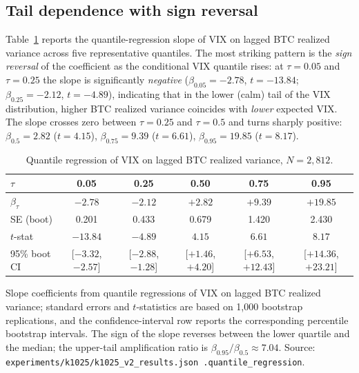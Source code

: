 \documentclass[11pt,a4paper]{article}
\begin{document}
\subsection{Tail dependence with sign reversal}
\label{subsec:r_qr}

Table~\ref{tab:qr} reports the quantile-regression slope of VIX on lagged BTC realized variance across five representative quantiles. The most striking pattern is the \emph{sign reversal} of the coefficient as the conditional VIX quantile rises: at $\tau = 0.05$ and $\tau = 0.25$ the slope is significantly \emph{negative} ($\beta_{0.05} = -2.78$, $t = -13.84$; $\beta_{0.25} = -2.12$, $t = -4.89$), indicating that in the lower (calm) tail of the VIX distribution, higher BTC realized variance coincides with \emph{lower} expected VIX. The slope crosses zero between $\tau = 0.25$ and $\tau = 0.5$ and turns sharply positive: $\beta_{0.5} = 2.82$ ($t = 4.15$), $\beta_{0.75} = 9.39$ ($t = 6.61$), $\beta_{0.95} = 19.85$ ($t = 8.17$).%

\begin{table}[H]
\centering
\caption{Quantile regression of VIX on lagged BTC realized variance, $N = 2{,}812$.}
\label{tab:qr}
\begin{tabular}{lccccc}
\toprule
$\tau$ & 0.05 & 0.25 & 0.50 & 0.75 & 0.95 \\
\midrule
$\beta_\tau$ & $-2.78$ & $-2.12$ & $+2.82$ & $+9.39$ & $+19.85$ \\
SE (boot)   & 0.201   & 0.433   & 0.679   & 1.420   & 2.430   \\
$t$-stat    & $-13.84$ & $-4.89$ & $4.15$  & $6.61$ & $8.17$  \\
95\% boot CI & [$-3.32$, $-2.57$] & [$-2.88$, $-1.28$] & [$+1.46$, $+4.20$] & [$+6.53$, $+12.43$] & [$+14.36$, $+23.21$] \\
\bottomrule
\end{tabular}
\begin{flushleft}
\footnotesize Slope coefficients from quantile regressions of VIX on lagged BTC realized variance; standard errors and $t$-statistics are based on 1{,}000 bootstrap replications, and the confidence-interval row reports the corresponding percentile bootstrap intervals. The sign of the slope reverses between the lower quartile and the median; the upper-tail amplification ratio is $\beta_{0.95} / \beta_{0.5} \approx 7.04$. Source: \texttt{experiments/k1025/k1025\_v2\_results.json .quantile\_regression}.
\end{flushleft}
\end{table}
\end{document}
